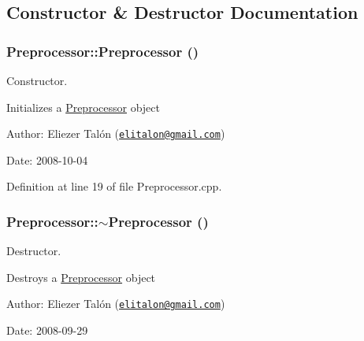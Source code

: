 \subsection{Constructor \& Destructor Documentation}
\hypertarget{class_preprocessor_da966c8b83e7c3bcd8759549c3cdf688}{
\subsubsection[Preprocessor]{\setlength{\rightskip}{0pt plus 5cm}Preprocessor::Preprocessor ()}}
\label{class_preprocessor_da966c8b83e7c3bcd8759549c3cdf688}


Constructor. 

Initializes a \hyperlink{class_preprocessor}{Preprocessor} object

\begin{Desc}
\item[Author:]Eliezer Talón (\href{mailto:elitalon@gmail.com}{\tt elitalon@gmail.com}) \end{Desc}
\begin{Desc}
\item[Date:]2008-10-04 \end{Desc}


Definition at line 19 of file Preprocessor.cpp.\hypertarget{class_preprocessor_3c16724bc9e18b12a45f5a7fe2752b1b}{
\subsubsection[$\sim$Preprocessor]{\setlength{\rightskip}{0pt plus 5cm}Preprocessor::$\sim$Preprocessor ()}}
\label{class_preprocessor_3c16724bc9e18b12a45f5a7fe2752b1b}


Destructor. 

Destroys a \hyperlink{class_preprocessor}{Preprocessor} object

\begin{Desc}
\item[Author:]Eliezer Talón (\href{mailto:elitalon@gmail.com}{\tt elitalon@gmail.com}) \end{Desc}
\begin{Desc}
\item[Date:]2008-09-29 \end{Desc}


